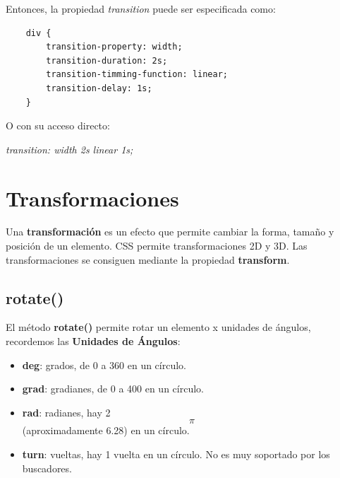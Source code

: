 Entonces, la propiedad \textit{transition} puede ser especificada como:
\begin{lstlisting}
    div {
        transition-property: width;
        transition-duration: 2s;
        transition-timming-function: linear;
        transition-delay: 1s;
    }
\end{lstlisting}

O con su acceso directo:
\begin{center}
    \textit{transition: width 2s linear 1s;}
\end{center}



\section{Transformaciones}

Una \textbf{transformación} es un efecto que permite cambiar la forma, tamaño y posición de un elemento. CSS permite transformaciones 2D y 3D. Las transformaciones se consiguen mediante la propiedad \textbf{transform}.


\subsection{rotate()}

El método \textbf{rotate()} permite rotar un elemento x unidades de ángulos, recordemos las \textbf{Unidades de Ángulos}:
\begin{itemize}
    \item \textbf{deg}: grados, de 0 a 360 en un círculo.
    \item \textbf{grad}: gradianes, de 0 a 400 en un círculo.
    \item \textbf{rad}: radianes, hay 2$$\pi$$ (aproximadamente 6.28) en un círculo.
    \item \textbf{turn}: vueltas, hay 1 vuelta en un círculo. No es muy soportado por los buscadores.
\end{itemize}

